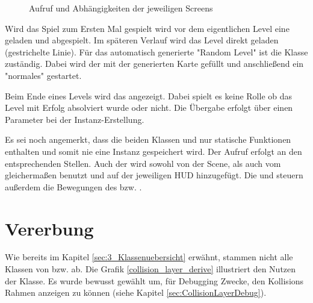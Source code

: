 \begin{figure}[H]
\scalebox{0.7}{}
\caption{Aufruf und Abhängigkeiten der jeweiligen Screens}
\label{calltree}
\end{figure}


Wird das Spiel zum Ersten Mal gespielt wird vor dem eigentlichen Level eine  geladen und abgespielt. Im späteren Verlauf wird das Level direkt geladen (gestrichelte Linie).
Für das automatisch generierte "Random Level" ist die  Klasse zuständig. Dabei wird der  mit der generierten Karte gefüllt und anschließend ein "normales"  gestartet.

Beim Ende eines Levels wird das  angezeigt. Dabei spielt es keine Rolle ob das Level mit Erfolg absolviert wurde oder nicht. Die Übergabe erfolgt über einen Parameter bei der Instanz-Erstellung.

Es sei noch angemerkt, dass die beiden Klassen  und  nur statische Funktionen enthalten und somit nie eine Instanz gespeichert wird. Der Aufruf erfolgt an den entsprechenden Stellen.
Auch der  wird sowohl von der  Scene, als auch vom  gleichermaßen benutzt und auf der jeweiligen HUD hinzugefügt. Die  und  steuern außerdem die Bewegungen des  bzw. .



\section{Vererbung}\label{sec:3_Vererbung}

Wie bereits im Kapitel \ref{sec:3_Klassenuebersicht} erwähnt, stammen nicht alle Klassen von  bzw.  ab. Die Grafik \ref{collision_layer_derive} illustriert den Nutzen der  Klasse.
Es wurde bewusst  gewählt um, für Debugging Zwecke, den Kollisions Rahmen anzeigen zu können (siehe Kapitel \ref{sec:CollisionLayerDebug}).

